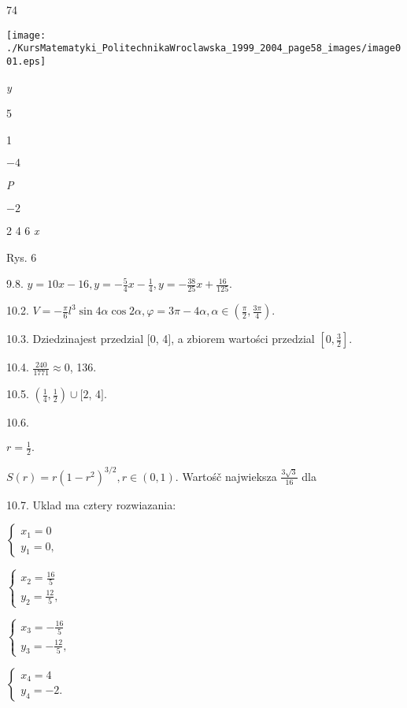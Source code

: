 \documentclass[a4paper,12pt]{article}
\begin{document}
74
\begin{center}
\texttt{[image: ./KursMatematyki\_PolitechnikaWroclawska\_1999\_2004\_page58\_images/image001.eps]}
\end{center}
{\it y}

5

1

$-4$

{\it P}

$-2$

2 4  6 {\it x}

Rys. 6

9.8. $y=10x-16, y=-\displaystyle \frac{5}{4}x-\frac{1}{4}, y=-\displaystyle \frac{38}{25}x+\frac{16}{125}.$

10.2. $V=-\displaystyle \frac{\pi}{6}l^{3}\sin 4\alpha\cos 2\alpha, \varphi=3\pi-4\alpha, \alpha\in (\displaystyle \frac{\pi}{2},\frac{3\pi}{4}).$

10.3. Dziedzinajest przedzial $[0$, 4$]$, a zbiorem wartości przedzial $[0,\displaystyle \frac{3}{2}].$

10.4. $\displaystyle \frac{240}{1771}\approx 0$, 136.

10.5. $(\displaystyle \frac{1}{4},\frac{1}{2})\cup[2$, 4$].$

10.6.

$r=\displaystyle \frac{1}{2}.$

$S(r) = r(1-r^{2})^{3/2}, r \in (0,1)$. Wartośč najwieksza $\displaystyle \frac{3\sqrt{3}}{16}$ dla

10.7. Uklad ma cztery rozwiazania:

$\left\{\begin{array}{l}
x_{1}=0\\
y_{1}=0,
\end{array}\right.$

$\left\{\begin{array}{l}
x_{2}=\frac{16}{5}\\
y_{2}=\frac{12}{5},
\end{array}\right.$

$\left\{\begin{array}{l}
x_{3}=-\frac{16}{5}\\
y_{3}=-\frac{12}{5},
\end{array}\right.$

$\left\{\begin{array}{l}
x_{4}=4\\
y_{4}=-2.
\end{array}\right.$
\end{document}

